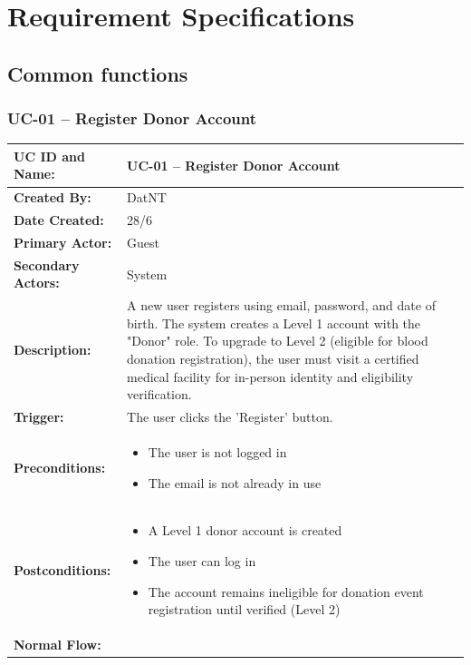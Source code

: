 \documentclass[12pt,a4paper]{article}
\begin{document}
\section{Requirement Specifications}

\subsection{Common functions}

\subsubsection{UC-01 – Register Donor Account}

\renewcommand{\arraystretch}{1.5}
\begin{longtable}{|p{4.5cm}|p{10.5cm}|}
\hline
\textbf{UC ID and Name:} & UC-01 – Register Donor Account \\
\hline
\textbf{Created By:} & DatNT \\
\hline
\textbf{Date Created:} & 28/6 \\
\hline
\textbf{Primary Actor:} & Guest \\
\hline
\textbf{Secondary Actors:} & System \\
\hline
\textbf{Description:} & A new user registers using email, password, and date of birth. The system creates a Level 1 account with the "Donor" role. To upgrade to Level 2 (eligible for blood donation registration), the user must visit a certified medical facility for in-person identity and eligibility verification. \\
\hline
\textbf{Trigger:} & The user clicks the 'Register' button. \\
\hline
\textbf{Preconditions:} &
\begin{itemize}
  \item The user is not logged in
  \item The email is not already in use
\end{itemize} \\
\hline
\textbf{Postconditions:} &
\begin{itemize}
  \item A Level 1 donor account is created
  \item The user can log in
  \item The account remains ineligible for donation event registration until verified (Level 2)
\end{itemize} \\
\hline
\textbf{Normal Flow:} &
\begin{enumerate}

\end{enumerate}
\end{longtable}
\end{document}
